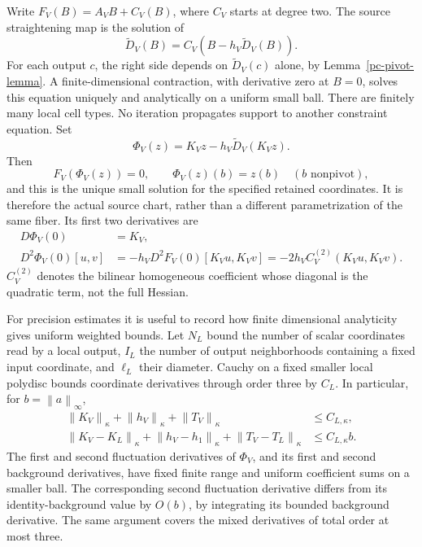 \documentclass[11pt]{article}
\theoremstyle{remark}
\newcommand{\norm}[1]{\left\|#1\right\|}
\begin{document}
Write $F_V(B)=A_VB+C_V(B)$, where $C_V$ starts at degree two.
The source straightening map is the solution of
\begin{equation}\label{pc-straightening}
 \widetilde D_V(B)=C_V(B-h_V\widetilde D_V(B)).
\end{equation}
For each output $c$, the right side depends on
$\widetilde D_V(c)$ alone, by Lemma~\ref{pc-pivot-lemma}.
A finite-dimensional contraction, with derivative zero at
$B=0$, solves this equation uniquely and analytically on a
uniform small ball. There are finitely many local cell types.
No iteration propagates support to another constraint equation.
Set
\begin{equation}\label{pc-exact-chart}
 \Phi_V(z)=K_Vz-h_V\widetilde D_V(K_Vz).
\end{equation}
Then
\begin{equation}\label{pc-chart-identities}
 F_V(\Phi_V(z))=0,\qquad
 \Phi_V(z)(b)=z(b)\quad(b\text{ nonpivot}),
\end{equation}
and this is the unique small solution for the specified retained
coordinates. It is therefore the actual source chart, rather
than a different parametrization of the same fiber. Its first
two derivatives are
\begin{equation}\label{pc-chart-derivatives}
 \begin{split}
 D\Phi_V(0)&=K_V,\\
 D^2\Phi_V(0)[u,v]
   &=-h_VD^2F_V(0)[K_Vu,K_Vv]
    =-2h_VC_V^{(2)}(K_Vu,K_Vv).
 \end{split}
\end{equation}
$C_V^{(2)}$ denotes the bilinear homogeneous coefficient whose
diagonal is the quadratic term, not the full Hessian.

For precision estimates it is useful to record how finite
dimensional analyticity gives uniform weighted bounds. Let
$N_L$ bound the number of scalar coordinates read by a local
output, $I_L$ the number of output neighborhoods containing a
fixed input coordinate, and $\ell_L$ their diameter. Cauchy on a
fixed smaller local polydisc bounds coordinate derivatives
through order three by $C_L$. In particular, for
$b=\norm a_\infty$,
\begin{equation}\label{pc-local-operators}
 \begin{split}
 \norm{K_V}_\kappa+\norm{h_V}_\kappa+\norm{T_V}_\kappa
      &\le C_{L,\kappa},\\
 \norm{K_V-K_L}_\kappa+\norm{h_V-h_1}_\kappa
       +\norm{T_V-T_L}_\kappa&\le C_{L,\kappa}b.
 \end{split}
\end{equation}
The first and second fluctuation derivatives of $\Phi_V$,
and its first and second background derivatives, have fixed
finite range and uniform coefficient sums on a smaller ball.
The corresponding second fluctuation derivative differs from
its identity-background value by $O(b)$, by integrating its
bounded background derivative. The same argument covers the
mixed derivatives of total order at most three.
\end{document}
